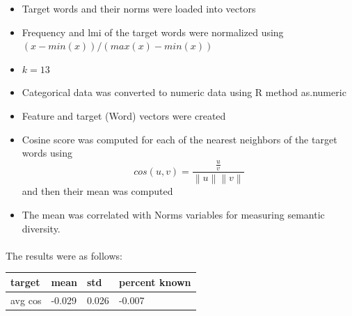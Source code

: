 \documentclass[11pt,a4paper]{article}
\begin{document}
\begin{itemize}
	\item Target words and their norms were loaded into vectors
	\item Frequency and lmi of the target words were normalized using
		$(x -min(x))/(max(x)-min(x))$
		
	\item $k = 13$
	\item Categorical data was converted to numeric data using R method as.numeric
	\item Feature and target (Word) vectors were created
	\item Cosine score was computed for each of the nearest neighbors of the target words using
	\begin{equation*}
	cos(u,v) = \frac{\frac{u}{v}}{\left \| u \right \| \left \| v \right \|}
	\end{equation*}
	and then their mean was computed
	
	\item The mean was correlated with Norms variables for measuring semantic diversity.
\end{itemize}

\paragraph{}
The results were as follows:
\begin{table}[H]
\centering
\begin{tabular}{@{}llll@{}}
\toprule
target  & mean   & std   & percent known \\ \midrule
avg cos & -0.029 & 0.026 & -0.007        \\ \bottomrule
\end{tabular}
\end{table}







\end{document}
